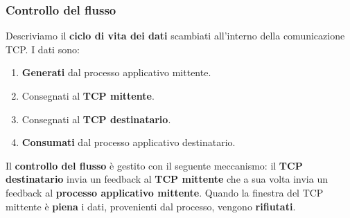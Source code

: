 \documentclass[11pt,a4paper,oneside]{book}
\theoremstyle{definition}
\begin{document}
\subsubsection{Controllo del flusso}
Descriviamo il \textbf{ciclo di vita dei dati} scambiati all'interno della comunicazione TCP. I dati sono:
\begin{enumerate}
	\item \textbf{Generati} dal processo applicativo mittente.
	\item Consegnati al \textbf{TCP mittente}.
	\item Consegnati al \textbf{TCP destinatario}.
	\item \textbf{Consumati} dal processo applicativo destinatario.
\end{enumerate}
Il \textbf{controllo del flusso} è gestito con il seguente meccanismo: il \textbf{TCP destinatario} invia un feedback al \textbf{TCP mittente} che a sua volta invia un feedback al \textbf{processo applicativo mittente}. Quando la finestra del TCP mittente è \textbf{piena} i dati, provenienti dal processo, vengono \textbf{rifiutati}.

\pagebreak
\end{document}
